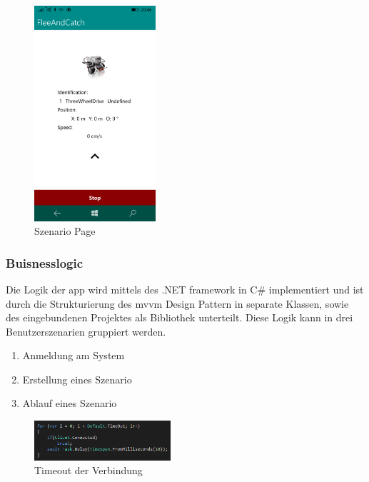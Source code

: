 \bigskip

\begin{figure}[h]
	\begin{center}
		\includegraphics[width=0.4\textwidth]{images/implementation/szenario.png}
	\end{center}	
	\caption{Szenario Page}
	\label{fig:szenario}
\end{figure}

\newpage
\subsubsection{Buisnesslogic} %

Die Logik der \gls{app} wird mittels des .NET \gls{framework} in C\# implementiert und ist durch die Strukturierung des \gls{mvvm} Design Pattern in separate Klassen, sowie des eingebundenen Projektes als Bibliothek unterteilt. Diese Logik kann in drei Benutzerszenarien gruppiert werden.
\begin{enumerate}
	\item Anmeldung am System
	\item Erstellung eines Szenario
	\item Ablauf eines Szenario
\end{enumerate}

\begin{figure}
	\begin{center}
		\includegraphics[width=0.45\textwidth]{images/implementation/timeout_app.png}
	\end{center}
	\caption{Timeout der Verbindung}
	\label{fig:timeout_app}
\end{figure}

